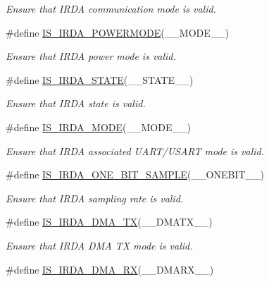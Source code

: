 \begin{DoxyCompactItemize}
\begin{DoxyCompactList}\small\item\em Ensure that I\+R\+DA communication mode is valid. \end{DoxyCompactList}\item 
\#define \hyperlink{group___i_r_d_a___private___macros_ga62955831ac6c4b3cf603046f74ddd88d}{I\+S\+\_\+\+I\+R\+D\+A\+\_\+\+P\+O\+W\+E\+R\+M\+O\+DE}(\+\_\+\+\_\+\+M\+O\+D\+E\+\_\+\+\_\+)
\begin{DoxyCompactList}\small\item\em Ensure that I\+R\+DA power mode is valid. \end{DoxyCompactList}\item 
\#define \hyperlink{group___i_r_d_a___private___macros_gadbef223495eba26be840e14cc37d34d8}{I\+S\+\_\+\+I\+R\+D\+A\+\_\+\+S\+T\+A\+TE}(\+\_\+\+\_\+\+S\+T\+A\+T\+E\+\_\+\+\_\+)
\begin{DoxyCompactList}\small\item\em Ensure that I\+R\+DA state is valid. \end{DoxyCompactList}\item 
\#define \hyperlink{group___i_r_d_a___private___macros_ga9e804e8a642eb9866ced93b6a47cc9cd}{I\+S\+\_\+\+I\+R\+D\+A\+\_\+\+M\+O\+DE}(\+\_\+\+\_\+\+M\+O\+D\+E\+\_\+\+\_\+)
\begin{DoxyCompactList}\small\item\em Ensure that I\+R\+DA associated U\+A\+R\+T/\+U\+S\+A\+RT mode is valid. \end{DoxyCompactList}\item 
\#define \hyperlink{group___i_r_d_a___private___macros_ga6bb7d320c0f8800d4cb5750cf24bf760}{I\+S\+\_\+\+I\+R\+D\+A\+\_\+\+O\+N\+E\+\_\+\+B\+I\+T\+\_\+\+S\+A\+M\+P\+LE}(\+\_\+\+\_\+\+O\+N\+E\+B\+I\+T\+\_\+\+\_\+)
\begin{DoxyCompactList}\small\item\em Ensure that I\+R\+DA sampling rate is valid. \end{DoxyCompactList}\item 
\#define \hyperlink{group___i_r_d_a___private___macros_gae9db415403482c9cc419e61cb5277d5f}{I\+S\+\_\+\+I\+R\+D\+A\+\_\+\+D\+M\+A\+\_\+\+TX}(\+\_\+\+\_\+\+D\+M\+A\+T\+X\+\_\+\+\_\+)
\begin{DoxyCompactList}\small\item\em Ensure that I\+R\+DA D\+MA TX mode is valid. \end{DoxyCompactList}\item 
\#define \hyperlink{group___i_r_d_a___private___macros_gab7a7ec8d5f6d340bad128dbe0c25f543}{I\+S\+\_\+\+I\+R\+D\+A\+\_\+\+D\+M\+A\+\_\+\+RX}(\+\_\+\+\_\+\+D\+M\+A\+R\+X\+\_\+\+\_\+)

\end{DoxyCompactItemize}
